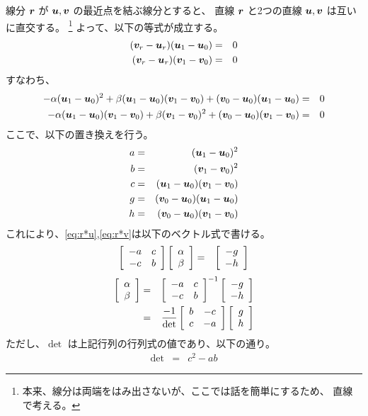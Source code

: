 \documentclass[11pt,a4j]{jarticle}
\begin{document}
線分 ${\bm{r}}$ が ${\bm{u}},{\bm{v}}$ の最近点を結ぶ線分とすると、
直線 ${\bm{r}}$ と2つの直線 ${\bm{u}},{\bm{v}}$ は互いに直交する。
	\footnote{本来、線分は両端をはみ出さないが、ここでは話を簡単にするため、
	  直線で考える。}
よって、以下の等式が成立する。
  \begin{eqnarray}
    ({\bm{v}}_r - {\bm{u}}_r) ({\bm{u}}_1 - {\bm{u}}_0) & = & 0
  \\
    ({\bm{v}}_r - {\bm{u}}_r) ({\bm{v}}_1 - {\bm{v}}_0) & = & 0
  \end{eqnarray}
すなわち、
  \begin{eqnarray}
    - \alpha ({\bm{u}}_1 - {\bm{u}}_0)^2
    + \beta  ({\bm{u}}_1 - {\bm{u}}_0)({\bm{v}}_1 - {\bm{v}}_0)
    + ({\bm{v}}_0 - {\bm{u}}_0)({\bm{u}}_1 - {\bm{u}}_0)
      & = & 0
  \label{eq:r*u}
  \\
    - \alpha ({\bm{u}}_1 - {\bm{u}}_0)({\bm{v}}_1 - {\bm{v}}_0)
    + \beta  ({\bm{v}}_1 - {\bm{v}}_0)^2
    + ({\bm{v}}_0 - {\bm{u}}_0)({\bm{v}}_1 - {\bm{v}}_0)
      & = & 0
  \label{eq:r*v}
  \end{eqnarray}
ここで、以下の置き換えを行う。
  \begin{eqnarray}
    a & = & ({\bm{u}}_1 - {\bm{u}}_0)^2
  \\
    b & = & ({\bm{v}}_1 - {\bm{v}}_0)^2
  \\
    c & = & ({\bm{u}}_1 - {\bm{u}}_0) ({\bm{v}}_1 - {\bm{v}}_0)
  \\
    g & = & ({\bm{v}}_0 - {\bm{u}}_0) ({\bm{u}}_1 - {\bm{u}}_0)
  \\
    h & = & ({\bm{v}}_0 - {\bm{u}}_0) ({\bm{v}}_1 - {\bm{v}}_0)
  \end{eqnarray}
これにより、\eqref{eq:r*u},\eqref{eq:r*v}は以下のベクトル式で書ける。
  \begin{eqnarray}
    \left[ \begin{array}[c]{cc} -a & c \\ -c & b \end{array} \right] \left[ \begin{array}[c]{c} \alpha \\ \beta \end{array} \right]
      & = &
        \left[ \begin{array}[c]{c} -g \\ -h \end{array} \right]
  \end{eqnarray}
  \begin{eqnarray}
    \left[ \begin{array}[c]{c} \alpha \\ \beta \end{array} \right]
      & = &
        \left[ \begin{array}[c]{cc} -a & c \\ -c & b \end{array} \right]^{-1} 
        \left[ \begin{array}[c]{c} -g \\ -h \end{array} \right]
  \\
      & = &
        \frac{-1}{\det}
        \left[ \begin{array}[c]{cc} b & -c \\ c & -a \end{array} \right]
        \left[ \begin{array}[c]{c} g \\ h \end{array} \right]
  \end{eqnarray}
ただし、$\det$ は上記行列の行列式の値であり、以下の通り。
  \begin{eqnarray}
    \det
      & = &
        c^2 - ab
  \end{eqnarray}
\end{document}

